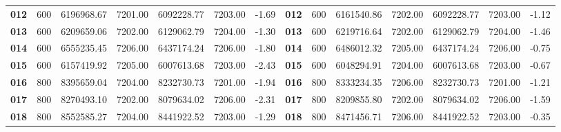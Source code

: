 \begin{table}[ht]
{\begin{tabular}{cccccccccccccc}
    \textbf{012}         & 600                         & 6196968.67          & 7201.00          & 6092228.77           & 7203.00       & -1.69                          & \textbf{012}         & 600                         & 6161540.86           & 7202.00           & 6092228.77           & 7203.00        & -1.12                           \\
    \textbf{013}         & 600                         & 6209659.06          & 7202.00          & 6129062.79           & 7204.00       & -1.30                          & \textbf{013}         & 600                         & 6219716.64           & 7202.00           & 6129062.79           & 7204.00        & -1.46                           \\
    \textbf{014}         & 600                         & 6555235.45          & 7206.00          & 6437174.24           & 7206.00       & -1.80                          & \textbf{014}         & 600                         & 6486012.32           & 7205.00           & 6437174.24           & 7206.00        & -0.75                           \\
    \textbf{015}         & 600                         & 6157419.92          & 7205.00          & 6007613.68           & 7203.00       & -2.43                          & \textbf{015}         & 600                         & 6048294.91           & 7204.00           & 6007613.68           & 7203.00        & -0.67                           \\
    \textbf{016}         & 800                         & 8395659.04          & 7204.00          & 8232730.73           & 7201.00       & -1.94                          & \textbf{016}         & 800                         & 8333234.35           & 7206.00           & 8232730.73           & 7201.00        & -1.21                           \\
    \textbf{017}         & 800                         & 8270493.10          & 7202.00          & 8079634.02           & 7206.00       & -2.31                          & \textbf{017}         & 800                         & 8209855.80           & 7202.00           & 8079634.02           & 7206.00        & -1.59                           \\
    \textbf{018}         & 800                         & 8552585.27          & 7204.00          & 8441922.52           & 7203.00       & -1.29                          & \textbf{018}         & 800                         & 8471456.71           & 7206.00           & 8441922.52           & 7203.00        & -0.35                           \\

\end{tabular}}
\end{table}
